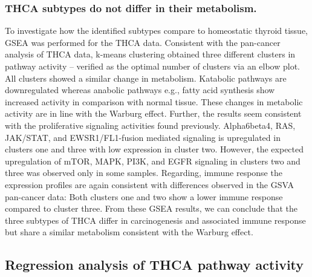 \documentclass[
]{article}
\begin{document}
\hypertarget{thca-subtypes-do-not-differ-in-their-metabolism.}{%
\subsubsection{THCA subtypes do not differ in their
metabolism.}\label{thca-subtypes-do-not-differ-in-their-metabolism.}}

To investigate how the identified subtypes compare to homeostatic
thyroid tissue, GSEA was performed for the THCA data. Consistent with
the pan-cancer analysis of THCA data, k-means clustering obtained three
different clusters in pathway activity -- verified as the optimal number
of clusters via an elbow plot. All clusters showed a similar change in
metabolism. Katabolic pathways are downregulated whereas anabolic
pathways e.g., fatty acid synthesis show increased activity in
comparison with normal tissue. These changes in metabolic activity are
in line with the Warburg effect. Further, the results seem consistent
with the proliferative signaling activities found previously.
Alpha6beta4, RAS, JAK/STAT, and EWSR1/FL1-fusion mediated signaling is
upregulated in clusters one and three with low expression in cluster
two. However, the expected upregulation of mTOR, MAPK, PI3K, and EGFR
signaling in clusters two and three was observed only in some samples.
Regarding, immune response the expression profiles are again consistent
with differences observed in the GSVA pan-cancer data: Both clusters one
and two show a lower immune response compared to cluster three. From
these GSEA results, we can conclude that the three subtypes of THCA
differ in carcinogenesis and associated immune response but share a
similar metabolism consistent with the Warburg effect.

\hypertarget{regression-analysis-of-thca-pathway-activity}{%
\subsection{Regression analysis of THCA pathway
activity}\label{regression-analysis-of-thca-pathway-activity}}
\end{document}
